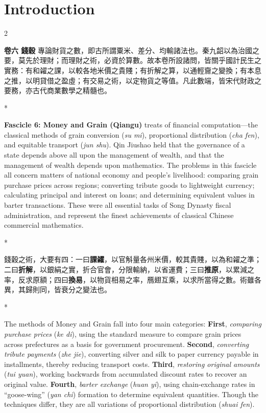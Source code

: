 \documentclass[11pt,a4paper]{article}
\newcommand{\switchCn}{\switchcolumn[0]*}
\newcommand{\switchEn}{\switchcolumn[1]*}
\begin{document}
\tableofcontents
\newpage

\section*{\color{titlecolor}Introduction}

\begin{paracol}{2}

\textbf{\color{sectioncolor}卷六 錢穀} 專論財貨之數，即古所謂粟米、差分、均輸諸法也。秦九韶以為治國之要，莫先於理財；而理財之術，必資於算數。故本卷所設諸問，皆關乎國計民生之實務：有和糴之課，以較各地米價之貴賤；有折解之算，以通輕齎之變換；有本息之推，以明貸借之盈虛；有交易之術，以定物貨之等值。凡此數端，皆宋代財政之要務，亦古代商業數學之精髓也。

\switchEn

\textbf{\color{sectioncolor}Fascicle 6: Money and Grain (Qiangu)} treats of financial computation---the classical methods of grain conversion (\textit{su mi}), proportional distribution (\textit{cha fen}), and equitable transport (\textit{jun shu}). Qin Jiushao held that the governance of a state depends above all upon the management of wealth, and that the management of wealth depends upon mathematics. The problems in this fascicle all concern matters of national economy and people's livelihood: comparing grain purchase prices across regions; converting tribute goods to lightweight currency; calculating principal and interest on loans; and determining equivalent values in barter transactions. These were all essential tasks of Song Dynasty fiscal administration, and represent the finest achievements of classical Chinese commercial mathematics.

\switchCn

錢穀之術，大要有四：一曰\textbf{課糴}，以官斛量各州米價，較其貴賤，以為和糴之準；二曰\textbf{折解}，以銀絹之實，折合官會，分限輸納，以省運費；三曰\textbf{推原}，以累減之率，反求原額；四曰\textbf{換易}，以物貨相易之率，鴈翅互乘，以求所當得之數。術雖各異，其歸則同，皆衰分之變法也。

\switchEn

The methods of Money and Grain fall into four main categories: \textbf{First}, \textit{comparing purchase prices} (\textit{ke di}), using the standard measure to compare grain prices across prefectures as a basis for government procurement. \textbf{Second}, \textit{converting tribute payments} (\textit{zhe jie}), converting silver and silk to paper currency payable in installments, thereby reducing transport costs. \textbf{Third}, \textit{restoring original amounts} (\textit{tui yuan}), working backwards from accumulated discount rates to recover an original value. \textbf{Fourth}, \textit{barter exchange} (\textit{huan yi}), using chain-exchange rates in ``goose-wing'' (\textit{yan chi}) formation to determine equivalent quantities. Though the techniques differ, they are all variations of proportional distribution (\textit{shuai fen}).


\end{paracol}
\end{document}
